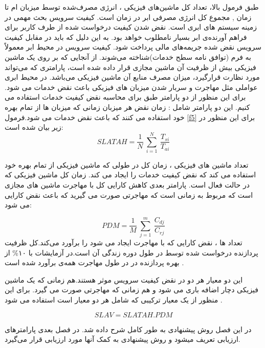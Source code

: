 طبق فرمول بالا،
 تعداد کل ماشین‌های فیزیکی ­،
  انرژی مصرف‌شده توسط میزبان 
   ام تا زمان
   ,
  مجموع کل انرژی مصرفی ابر در زمان
   است­.
   کیفیت سرویس بحث مهمی در زمینه سیستم های ابری است. نقض شدن کیفیت درخواست شده از طرف کاربر برای فراهم آورنده‌ی ابر بسیار نامطلوب خواهد بود. به این دلیل که باید در مقابل کیفیت سرویس نقض شده جریمه‌های مالی پرداخت شود. کیفیت سرویس در محیط ابر معمولاً به فرم
   (توافق نامه سطح خدمات)شناخته می‌شوند. از آنجایی که بر روی یک ماشین فیزیکی بیش از ظرفیت آن ماشین مجازی قرار داده‌ شده ‌است، پارامتری که می‌تواند مورد نظارت قرار‌گیرد، میزان مصرف منابع آن ماشین فیزیکی می‌باشد. 
   در محیط ابری عواملی مثل مهاجرت و سربار شدن میزبان های فیزیکی باعث نقض خدمات می شود. برای این منظور از دو پارامتر طبق
\cite{num15, num16}
   برای محاسبه نقض کیفیت خدمات استفاده می کنیم. این دو پارامتر شامل :
   زمان نقض
   هر میزبان
   زمانی که میزبان ها از تمام بهره خود استفاده می کنند که باعث نقض خدمات می شود.فرمول
\ref{f5}
    برای این منظور در زیر بیان شده است:
\cite{num16}
\begin{equation}
SLATAH=\frac{1}{N}\:\sum_{i=1}^{N}\:\frac{T_{si}}{T_{ai}}
\label{f5}
\end{equation}
   
   تعداد ماشین های فیزیکی ،
      زمان کل در طولی که ماشین فیزیکی 
    از تمام بهره خود استفاده می کند که نقض کیفیت خدمات را ایجاد می کند. 
      زمان کل ماشین فیزیکی 
    که در حالت فعال است. 
   پارامتر بعدی کاهش کارایی کل با مهاجرت ماشین های مجازی
   است که مربوط به زمانی است که مهاجرتی صورت می گیرید که باعث نقض کارایی می شود: 
\cite{num16}

\begin{equation}
PDM = \frac{1}{M}\:\sum_{j=1}^{m}\:\frac{C_{dj}}{C_{rj}}
\label{f6}
\end{equation}
   تعداد
   ها ، 
    نقض کارایی 
    که با مهاجرت ایجاد می شود را برآورد می‌کند.کل ظرفیت پردازنده درخواست شده 
    توسط
          در طول دوره زندگی آن است.در آزمایشات 
      با 
      ۱۰\%
        از بهره پردازنده در
     در طول مهاجرت همه‌ی
     برآورد شده است .
     
   این دو معیار هر دو در نقض کیفیت سرویس موثر هستند.هم زمانی که یک ماشین فیزیکی دچار اضافه باری می شود و هم زمانی که مهاجرتی صورت می گیرد. برای این منظور از یک معیار ترکیبی که شامل هر دو معیار است استفاده می شود
   \cite{num16} .

\begin{equation}
   SLAV = SLATAH.PDM
\end{equation}
   
   در این فصل روش پیشنهادی به طور کامل شرح داده شد. در فصل بعدی پارامترهای ارزیابی تعریف می­شود و روش پیشنهادی به کمک آنها مورد ارزیابی قرار می‌گیرد.